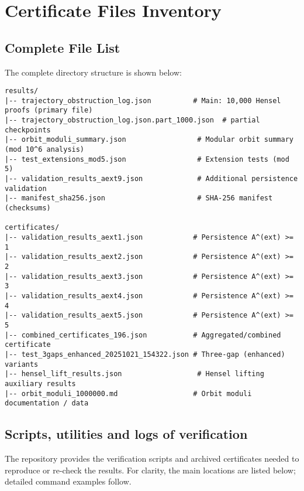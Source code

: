 \documentclass[11pt,a4paper]{article}
\theoremstyle{definition}
\begin{document}
\section{Certificate Files Inventory}

\subsection{Complete File List}

The complete directory structure is shown below:

\begin{lstlisting}[style=bashstyle, caption={Certificate Directory Structure}]
results/
|-- trajectory_obstruction_log.json          # Main: 10,000 Hensel proofs (primary file)
|-- trajectory_obstruction_log.json.part_1000.json  # partial checkpoints
|-- orbit_moduli_summary.json                 # Modular orbit summary (mod 10^6 analysis)
|-- test_extensions_mod5.json                 # Extension tests (mod 5)
|-- validation_results_aext9.json             # Additional persistence validation
|-- manifest_sha256.json                      # SHA-256 manifest (checksums)

certificates/
|-- validation_results_aext1.json            # Persistence A^(ext) >= 1
|-- validation_results_aext2.json            # Persistence A^(ext) >= 2
|-- validation_results_aext3.json            # Persistence A^(ext) >= 3
|-- validation_results_aext4.json            # Persistence A^(ext) >= 4
|-- validation_results_aext5.json            # Persistence A^(ext) >= 5
|-- combined_certificates_196.json           # Aggregated/combined certificate
|-- test_3gaps_enhanced_20251021_154322.json # Three-gap (enhanced) variants
|-- hensel_lift_results.json                  # Hensel lifting auxiliary results
|-- orbit_moduli_1000000.md                  # Orbit moduli documentation / data
\end{lstlisting}

\subsection{Scripts, utilities and logs of verification}

The repository provides the verification scripts and archived certificates needed to reproduce or re-check the results. For clarity, the main locations are listed below; detailed command examples follow.
\end{document}
